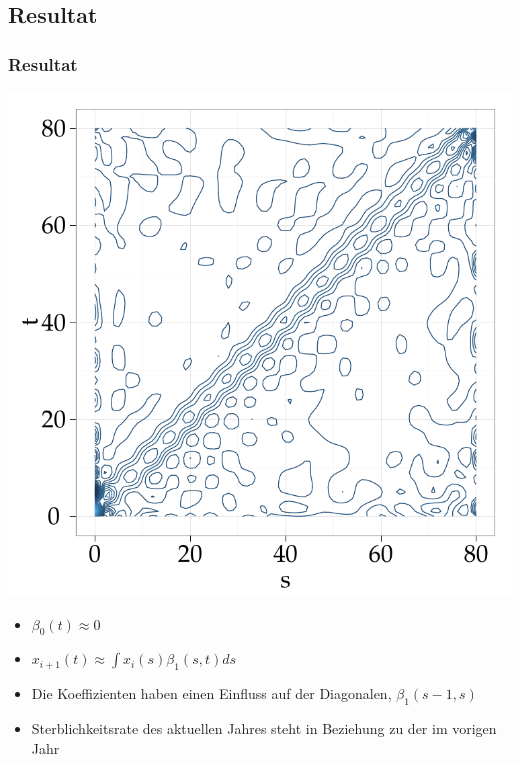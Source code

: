 \documentclass[xcolor=dvipsnames, compress, serif, professionalfont, handout]{beamer}
\newenvironment{knitrout}{}{} %
\renewenvironment{knitrout}{\begin{footnotesize}}{\end{footnotesize}}
\begin{document}
%
%

\subsection{Resultat}
\begin{frame}[fragile]
\frametitle{Resultat}
  \begin{minipage}{0.48\textwidth}
\begin{knitrout}
\color{fgcolor}

{\centering \includegraphics[width=\linewidth,height=\linewidth]{figure/graphics-GR_res} 

}


\end{knitrout}

  \end{minipage} 
  \hspace{0.1cm}
  \begin{minipage}{0.48\textwidth}
    \begin{itemize}
    \item $\beta_{0}(t) \approx 0$
    \item $x_{i+1}(t) \approx \int x_i(s) \beta_1(s, t)ds$ 
    \item Die Koeffizienten haben einen Einfluss auf der Diagonalen,
    $\beta_1(s-1, s)$
    \item Sterblichkeitsrate des aktuellen Jahres steht in Beziehung zu der 
    im vorigen Jahr
 \end{itemize}
  \end{minipage}
\end{frame}
 
\end{document}
